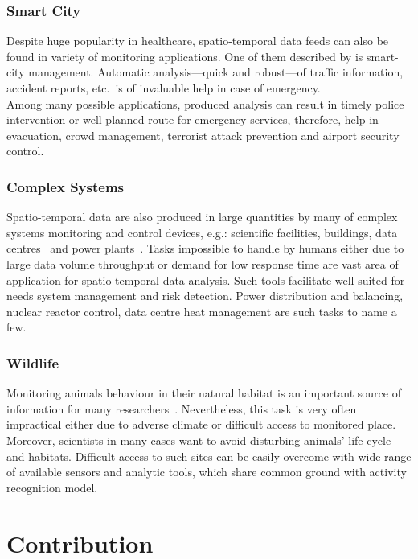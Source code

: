 \documentclass[12pt, a4paper, pdflatex, leqno, twoside, openright]{report}
\begin{document}
      \subsubsection{Smart City}
Despite huge popularity in healthcare, spatio-temporal data feeds can also be found in variety of monitoring applications. One of them described by \citet{filipponi2010smart} is smart-city management. Automatic analysis---quick and robust---of traffic information, accident reports, etc.\ is of invaluable help in case of emergency.\\
Among many possible applications, produced analysis can result in timely police intervention or well planned route for emergency services, therefore, help in evacuation, crowd management, terrorist attack prevention and airport security control.

      \subsubsection{Complex Systems}
Spatio-temporal data are also produced in large quantities by many of complex systems monitoring and control devices, e.g.: scientific facilities, buildings, data centres~\citep{moore2005data} and power plants~\citep{amin2005toward}. 
Tasks impossible to handle by humans either due to large data volume throughput or demand for low response time are vast area of application for spatio-temporal data analysis. Such tools facilitate well suited for needs system management and risk detection. Power distribution and balancing, nuclear reactor control, data centre heat management are such tasks to name a few.

      \subsubsection{Wildlife}
Monitoring animals behaviour in their natural habitat is an important source of information for many researchers~\citep{Szewczyk:2004:HMS:990680.990704}. Nevertheless, this task is very often impractical either due to adverse climate or difficult access to monitored place. Moreover, scientists in many cases want to avoid disturbing animals' life-cycle and habitats. Difficult access to such sites can be easily overcome with wide range of available sensors and analytic tools, which share common ground with activity recognition model.


  \section{Contribution}
\end{document}
